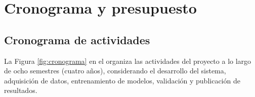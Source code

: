 
\chapter{Cronograma y presupuesto}

\label{Chapter4}

\section{Cronograma de actividades}

La Figura \ref{fig:cronograma} en el  organiza las actividades del proyecto a lo largo de ocho semestres (cuatro años), considerando el desarrollo del sistema, adquisición de datos, entrenamiento de modelos, validación y publicación de resultados.

